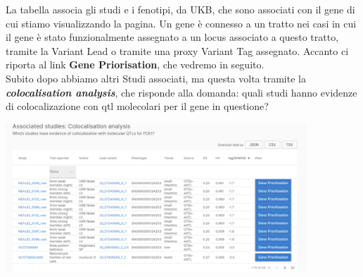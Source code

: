 \documentclass{article}
\begin{document}
La tabella associa gli studi e i fenotipi, da UKB, che sono associati con il gene di cui stiamo visualizzando la pagina. Un gene è connesso a un tratto nei casi in cui il gene è stato funzionalmente assegnato a un locus associato a questo tratto, tramite la Variant Lead o tramite una proxy Variant Tag assegnato. Accanto ci riporta al link \textbf{Gene Priorisation}, che vedremo in seguito.\\
Subito dopo abbiamo altri Studi associati, ma questa volta tramite la \textit{\textbf{colocalisation analysis}}, che risponde alla domanda: quali studi hanno evidenze di colocalizazione con qtl molecolari per il gene in questione?
\begin{center}
    \includegraphics[width=0.85\textwidth]{figures/3-Gene.png}
\end{center}
\end{document}
